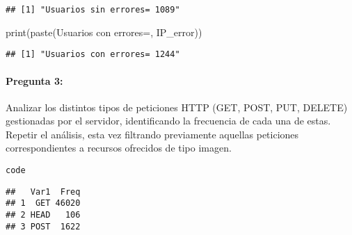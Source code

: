 \documentclass[
]{article}
\newenvironment{Shaded}{\begin{snugshade}}{\end{snugshade}}
\newcommand{\CommentTok}[1]{\textcolor[rgb]{0.56,0.35,0.01}{\textit{#1}}}
\newcommand{\FunctionTok}[1]{\textcolor[rgb]{0.00,0.00,0.00}{#1}}
\newcommand{\NormalTok}[1]{#1}
\newcommand{\OtherTok}[1]{\textcolor[rgb]{0.56,0.35,0.01}{#1}}
\newcommand{\SpecialCharTok}[1]{\textcolor[rgb]{0.00,0.00,0.00}{#1}}
\newcommand{\StringTok}[1]{\textcolor[rgb]{0.31,0.60,0.02}{#1}}
\begin{document}
\begin{verbatim}
## [1] "Usuarios sin errores= 1089"
\end{verbatim}

\begin{Shaded}
\begin{Highlighting}[]
\FunctionTok{print}\NormalTok{(}\FunctionTok{paste}\NormalTok{(}\StringTok{\textquotesingle{}Usuarios con errores=\textquotesingle{}}\NormalTok{, IP\_error))}
\end{Highlighting}
\end{Shaded}

\begin{verbatim}
## [1] "Usuarios con errores= 1244"
\end{verbatim}

\hypertarget{pregunta-3}{%
\paragraph{Pregunta 3:}\label{pregunta-3}}

Analizar los distintos tipos de peticiones HTTP (GET, POST, PUT, DELETE)
gestionadas por el servidor, identificando la frecuencia de cada una de
estas. Repetir el análisis, esta vez filtrando previamente aquellas
peticiones correspondientes a recursos ofrecidos de tipo imagen.

\texttt{code}

\begin{Shaded}
\end{Shaded}

\begin{verbatim}
##   Var1  Freq
## 1  GET 46020
## 2 HEAD   106
## 3 POST  1622
\end{verbatim}
\end{document}

